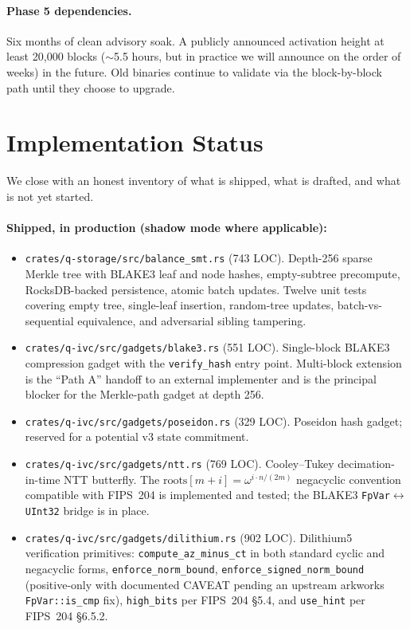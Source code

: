\documentclass[11pt,a4paper]{article}
\begin{document}
\paragraph{Phase 5 dependencies.} Six months of clean advisory
soak. A publicly announced activation height at least 20{,}000 blocks
($\sim$5.5 hours, but in practice we will announce on the order of
weeks) in the future. Old binaries continue to validate via the
block-by-block path until they choose to upgrade.

\section{Implementation Status}
\label{sec:status}

We close with an honest inventory of what is shipped, what is drafted,
and what is not yet started.

\paragraph{Shipped, in production (shadow mode where applicable):}
\begin{itemize}[leftmargin=*]
  \item \texttt{crates/q-storage/src/balance\_smt.rs} (743 LOC).
        Depth-256 sparse Merkle tree with BLAKE3 leaf and node hashes,
        empty-subtree precompute, RocksDB-backed persistence, atomic
        batch updates. Twelve unit tests covering empty tree,
        single-leaf insertion, random-tree updates, batch-vs-sequential
        equivalence, and adversarial sibling tampering.
  \item \texttt{crates/q-ivc/src/gadgets/blake3.rs} (551 LOC).
        Single-block BLAKE3 compression gadget with the
        \texttt{verify\_hash} entry point. Multi-block extension is the
        ``Path A'' handoff to an external implementer and is the
        principal blocker for the Merkle-path gadget at depth 256.
  \item \texttt{crates/q-ivc/src/gadgets/poseidon.rs} (329 LOC).
        Poseidon hash gadget; reserved for a potential v3 state
        commitment.
  \item \texttt{crates/q-ivc/src/gadgets/ntt.rs} (769 LOC).
        Cooley--Tukey decimation-in-time NTT butterfly. The
        $\mathrm{roots}[m+i] = \omega^{i \cdot n / (2m)}$ negacyclic
        convention compatible with FIPS~204 is implemented and
        tested; the BLAKE3 \texttt{FpVar}$\leftrightarrow$\texttt{UInt32}
        bridge is in place.
  \item \texttt{crates/q-ivc/src/gadgets/dilithium.rs} (902 LOC).
        Dilithium5 verification primitives:
        \texttt{compute\_az\_minus\_ct} in both standard cyclic and
        negacyclic forms, \texttt{enforce\_norm\_bound},
        \texttt{enforce\_signed\_norm\_bound} (positive-only with
        documented CAVEAT pending an upstream arkworks
        \texttt{FpVar::is\_cmp} fix), \texttt{high\_bits} per
        FIPS~204 \S5.4, and \texttt{use\_hint} per FIPS~204 \S6.5.2.
\end{itemize}
\end{document}
